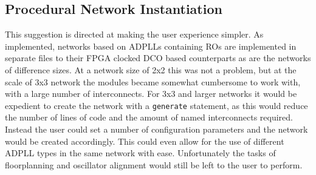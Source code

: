 \subsection{Procedural Network Instantiation}
This suggestion is directed at making the user experience simpler. As implemented, networks based on \ac{ADPLL}s containing \ac{RO}s are implemented in separate files to their \ac{FPGA} clocked \ac{DCO} based counterparts as are the networks of difference sizes. At a network size of 2x2 this was not a problem, but at the scale of 3x3 network the modules became somewhat cumbersome to work with, with a large number of interconnects. For 3x3 and larger networks it would be expedient to create the network with a \texttt{generate} statement, as this would reduce the number of lines of code and the amount of named interconnects required. Instead the user could set a number of configuration parameters and the network would be created accordingly. This could even allow for the use of different \ac{ADPLL} types in the same network with ease. Unfortunately the tasks of floorplanning and oscillator alignment would still be left to the user to perform.
